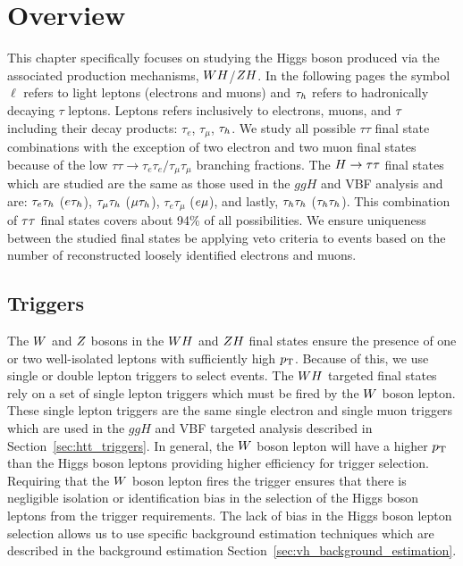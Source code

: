 \section{Overview}
This chapter specifically focuses on studying the Higgs boson produced via the associated
production mechanisms, $WH$/$ZH$.
In the following pages the symbol $\ell$ refers to light leptons (electrons and muons) and $\tau_{h}$ refers to hadronically
decaying $\tau$ leptons. Leptons refers inclusively to electrons, muons, and $\tau$ including their decay products:
$\tau_{e}$, $\tau_{\mu}$, $\tau_{h}$.
We study all possible $\tau\tau$ final state combinations with the
exception of two electron and two muon final states because of the low 
$\tau\tau \to \tau_{e}\tau_{e}/\tau_{\mu}\tau_{\mu}$
branching fractions. The $H\to\tau\tau$ final states which are
studied are the same as those used in the $ggH$ and VBF analysis and are: 
$\tau_{e}\tau_{h}$ ($e\tau_{h}$), $\tau_{\mu}\tau_{h}$ ($\mu\tau_{h}$),
$\tau_{e}\tau_{\mu}$ ($e\mu$), and lastly, $\tau_{h}\tau_{h}$ ($\tau_{h}\tau_{h}$).
This combination of $\tau\tau$ final states covers about 94\% of all possibilities.
We ensure uniqueness between the studied final states be applying veto criteria to events based
on the number of reconstructed loosely identified electrons and muons.



\subsection{Triggers}
The $W$ and $Z$ bosons in the $WH$ and $ZH$ final states ensure the presence of one 
or two well-isolated leptons with sufficiently high $p_\mathrm{T}$. Because of this,
we use single or double lepton triggers to select events.
The $WH$ targeted final states rely on a set of single lepton triggers
which must be fired by the $W$ boson lepton. These single
lepton triggers are the same single electron and single muon triggers which are 
used in the $ggH$ and VBF targeted analysis described in 
Section~\ref{sec:htt_triggers}. In general, the $W$ boson lepton
will have a higher $p_\mathrm{T}$ than the Higgs boson leptons providing
higher efficiency for trigger selection. Requiring that the $W$
boson lepton fires the trigger ensures that there is negligible
isolation or identification
bias in the selection of the Higgs boson leptons from the trigger
requirements. The lack of bias in the Higgs boson lepton selection 
allows us to use specific background estimation techniques which are described
in the background estimation Section~\ref{sec:vh_background_estimation}.

